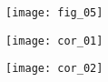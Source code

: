%

%
%
%
%



\ifprof

\begin{center}
\texttt{[image: fig\_05]}
\end{center}

\begin{center}
\texttt{[image: cor\_01]}
\end{center}

\begin{center}
\texttt{[image: cor\_02]}

\end{center}

\else
\fi